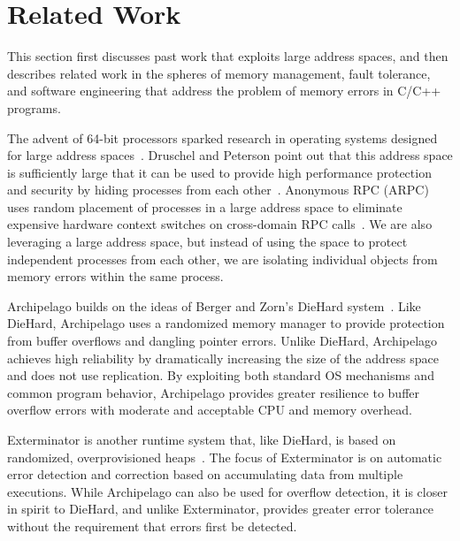 \documentclass{acm_proc_article-sp}
\begin{document}
\section{Related Work}



\label{sec:related}

\noindent
This section first discusses past work that exploits large address
spaces, and then describes related work in the spheres of memory
management, fault tolerance, and software engineering that address the
problem of memory errors in C/C++ programs.

The advent of 64-bit processors sparked research in operating systems
designed for large address spaces~\cite{chase94opal}.  Druschel and
Peterson point out that this address space is sufficiently large that it
can be used to provide high performance protection and security by
hiding processes from each other~\cite{druschel92hiding}.  Anonymous
RPC (ARPC) uses random placement of processes in a large address space
to eliminate expensive hardware context switches on cross-domain
RPC calls~\cite{yarvin93usenix}.  We are also leveraging a large
address space, but instead of using the space to protect independent
processes from each other, we are isolating individual objects from
memory errors within the same process.




Archipelago builds on the ideas of Berger and Zorn's DieHard
system~\cite{1134000}. Like DieHard, Archipelago uses a randomized
memory manager to provide protection from buffer overflows and
dangling pointer errors.  Unlike DieHard, Archipelago achieves high
reliability by dramatically increasing the size of the address space
and does not use replication.  By exploiting both standard OS
mechanisms and common program behavior, Archipelago provides greater
resilience to buffer overflow errors with moderate and acceptable CPU
and memory overhead.

Exterminator is another runtime system that, like DieHard, is based on
randomized, overprovisioned heaps~\cite{novark07exterminator}.  The
focus of Exterminator is on automatic error detection and correction
based on accumulating data from multiple executions.  While
Archipelago can also be used for overflow detection, it is closer in
spirit to DieHard, and unlike Exterminator, provides greater error
tolerance without the requirement that errors first be detected.
\end{document}
